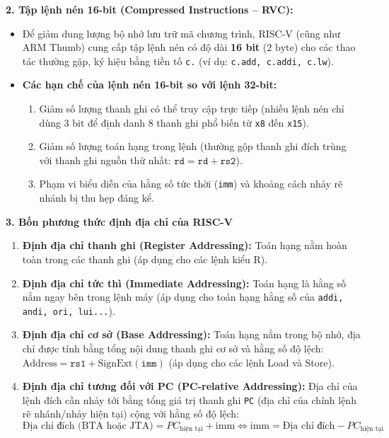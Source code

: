 \textbf{2. Tập lệnh nén 16-bit (Compressed Instructions -- RVC):}
\begin{itemize}
    \item Để giảm dung lượng bộ nhớ lưu trữ mã chương trình, RISC-V (cũng như ARM Thumb) cung cấp tập lệnh nén có độ dài \textbf{16 bit} ($2\text{ byte}$) cho các thao tác thường gặp, ký hiệu bằng tiền tố \texttt{c.} (ví dụ: \texttt{c.add, c.addi, c.lw}).
    \item \textbf{Các hạn chế của lệnh nén 16-bit so với lệnh 32-bit:}
    \begin{enumerate}
        \item Giảm số lượng thanh ghi có thể truy cập trực tiếp (nhiều lệnh nén chỉ dùng 3 bit để định danh 8 thanh ghi phổ biến từ \texttt{x8} đến \texttt{x15}).
        \item Giảm số lượng toán hạng trong lệnh (thường gộp thanh ghi đích trùng với thanh ghi nguồn thứ nhất: $\texttt{rd} = \texttt{rd} + \texttt{rs2}$).
        \item Phạm vi biểu diễn của hằng số tức thời (\texttt{imm}) và khoảng cách nhảy rẽ nhánh bị thu hẹp đáng kể.
    \end{enumerate}
\end{itemize}

\textbf{3. Bốn phương thức định địa chỉ của RISC-V}
\begin{enumerate}
    \item \textbf{Định địa chỉ thanh ghi (Register Addressing):} Toán hạng nằm hoàn toàn trong các thanh ghi (áp dụng cho các lệnh kiểu R).
    \item \textbf{Định địa chỉ tức thì (Immediate Addressing):} Toán hạng là hằng số nằm ngay bên trong lệnh máy (áp dụng cho toán hạng hằng số của \texttt{addi, andi, ori, lui...}).
    \item \textbf{Định địa chỉ cơ sở (Base Addressing):} Toán hạng nằm trong bộ nhớ, địa chỉ được tính bằng tổng nội dung thanh ghi cơ sở và hằng số độ lệch: $\text{Address} = \texttt{rs1} + \text{SignExt}(\texttt{imm})$ (áp dụng cho các lệnh Load và Store).
    \item \textbf{Định địa chỉ tương đối với PC (PC-relative Addressing):} Địa chỉ của lệnh đích cần nhảy tới bằng tổng giá trị thanh ghi \texttt{PC} (địa chỉ của chính lệnh rẽ nhánh/nhảy hiện tại) cộng với hằng số độ lệch:
    $$\text{Địa chỉ đích (BTA hoặc JTA)} = PC_{\text{hiện tại}} + \text{imm} \iff \text{imm} = \text{Địa chỉ đích} - PC_{\text{hiện tại}}$$
\end{enumerate}

